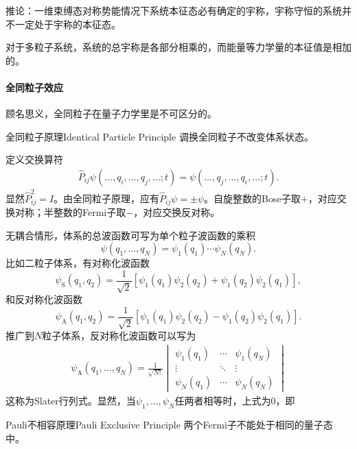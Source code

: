 推论：一维束缚态对称势能情况下系统本征态必有确定的宇称，宇称守恒的系统并不一定处于宇称的本征态。

对于多粒子系统，系统的总宇称是各部分相乘的，而能量等力学量的本征值是相加的。
\paragraph{全同粒子效应}顾名思义，全同粒子在量子力学里是不可区分的。
\begin{theorem}{全同粒子原理}{Identical Particle Principle}
	调换全同粒子不改变体系状态。
\end{theorem}
定义交换算符
\begin{align}
	\hat P_{ij}\psi(\ldots,q_i,\ldots,q_j,\ldots;t)=\psi(\ldots,q_j,\ldots,q_i,\ldots;t).
\end{align}
显然$\hat P_{ij}^2=I$。由全同粒子原理，应有$\hat P_{ij}\psi=\pm\psi$。自旋整数的Bose子取$+$，对应交换对称；半整数的Fermi子取$-$，对应交换反对称。

无耦合情形，体系的总波函数可写为单个粒子波函数的乘积
\[
	\psi(q_1,\ldots,q_N)=\psi_1(q_1)\cdots\psi_N(q_N).
\]
比如二粒子体系，有对称化波函数
\[
	\psi_\mathrm S(q_1,q_2)=\frac1{\sqrt2}[\psi_1(q_1)\psi_2(q_2)+\psi_1(q_2)\psi_2(q_1)],
\]
和反对称化波函数
\[
	\psi_\mathrm A(q_1,q_2)=\frac1{\sqrt2}[\psi_1(q_1)\psi_2(q_2)-\psi_1(q_2)\psi_2(q_1)].
\]
推广到$N$粒子体系，反对称化波函数可以写为
\begin{align}
	\psi_\mathrm A(q_1,\ldots,q_N)=\frac1{\sqrt{N!}}\begin{vmatrix}
		\psi_1(q_1)&\cdots&\psi_1(q_N)\\
		\vdots&\ddots&\vdots\\
		\psi_N(q_1)&\cdots&\psi_N(q_N)
	\end{vmatrix}
\end{align}
这称为Slater行列式。显然，当$\psi_1,\ldots,\psi_N$任两者相等时，上式为0，即
\begin{theorem}{Pauli不相容原理}{Pauli Exclusive Principle}
	两个Fermi子不能处于相同的量子态中。
\end{theorem}